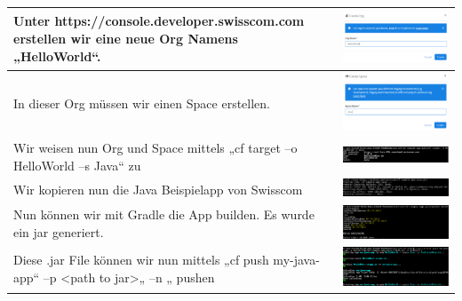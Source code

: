 \begin{longtable}{| p{5cm} | p{11cm} |}
Unter https://console.developer.swisscom.com erstellen wir eine neue Org Namens „HelloWorld“. &\includegraphics[width=0.65\columnwidth, valign=T]{images/image7.png} \\ \hline
In dieser Org müssen wir einen Space erstellen. 
&\includegraphics[width=0.65\columnwidth, valign=T]{images/image8.png} \\ \hline
Wir weisen nun Org und Space mittels „cf target –o HelloWorld –s Java“ zu &\includegraphics[width=0.65\columnwidth, valign=T]{images/image9.png} \\ \hline
Wir kopieren nun die Java Beispielapp von Swisscom 
&\includegraphics[width=0.65\columnwidth, valign=T]{images/image10.png} \\ \hline
Nun können wir mit Gradle die App builden. Es wurde ein jar generiert. &\includegraphics[width=0.65\columnwidth, valign=T]{images/image11.png} \\ \hline
Diese .jar File können wir nun mittels „cf push my-java-app“ –p <path to jar>„ –n „ pushen &\includegraphics[width=0.65\columnwidth, valign=T]{images/image12.png} \\ \hline

\end{longtable}

